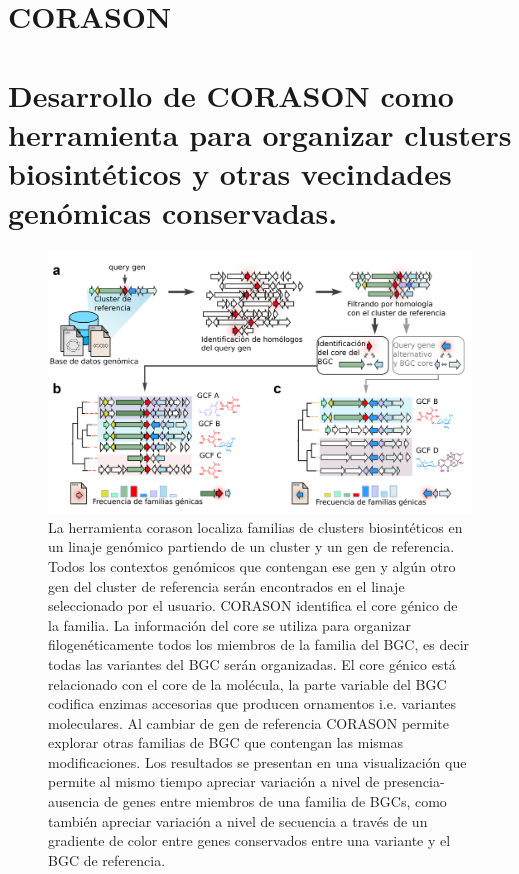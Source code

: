 \documentclass[12pt,twoside]{reedthesis}
\begin{document}
  \hypertarget{ref_labels}{\chapter{CORASON}\label{ref_labels}}
  
  \chapter{Desarrollo de CORASON como herramienta para organizar clusters
  biosintéticos y otras vecindades genómicas
  conservadas.}\label{desarrollo-de-corason-como-herramienta-para-organizar-clusters-biosinteticos-y-otras-vecindades-genomicas-conservadas.}
  
  \begin{figure}[h!tbp]
  \centering
  \includegraphics[angle = 0,scale = .6]{chapter3/Corason-pipe.pdf}
  \caption[La herramienta corason localiza familias de clusters biosintéticos en un linaje genómico partiendo de un cluster y un gen de referencia.]{\footnotesize{La herramienta corason localiza familias de clusters biosintéticos en un linaje genómico partiendo de un cluster y un gen de referencia. Todos los contextos genómicos que contengan ese gen y algún otro gen del cluster de referencia serán encontrados en el linaje seleccionado por el usuario. CORASON identifica el core génico de la familia. La información del core se utiliza para organizar filogenéticamente todos los miembros de la familia del BGC, es decir todas las variantes del BGC serán organizadas. El core génico está relacionado con el core de la molécula, la parte variable del BGC codifica enzimas accesorias que producen ornamentos i.e. variantes moleculares. Al cambiar de gen de referencia CORASON permite explorar otras familias de BGC que contengan las mismas modificaciones. Los resultados se presentan en una visualización que permite al mismo tiempo apreciar variación a nivel de presencia-ausencia de genes entre miembros de una familia de BGCs, como también apreciar variación a nivel de secuencia a través de un gradiente de color entre genes conservados entre una variante y el BGC de referencia.}}
  \label{fig:Corason-pipe}
  \end{figure}
  
\end{document}
